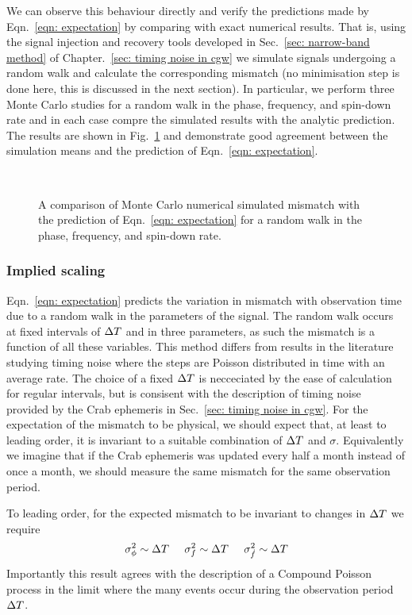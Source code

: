 We can observe this behaviour directly and verify the predictions made by
Eqn.~\eqref{eqn: expectation} by comparing with exact numerical results. That
is, using the signal injection and recovery tools developed in Sec.~\ref{sec:
narrow-band method} of Chapter.~\ref{sec: timing noise in cgw} we simulate
signals undergoing a random walk and calculate the corresponding mismatch (no
minimisation step is done here, this is discussed in the next section). In
particular, we perform three Monte Carlo studies for a random walk in the
phase, frequency, and spin-down rate and in each case compre the simulated
results with the analytic prediction. The results are shown in Fig.~\ref{fig: rw I}
and demonstrate good agreement between the simulation means and the prediction
of Eqn.~\eqref{eqn: expectation}.

\begin{figure}[ht]
\centering
{}
\\ 
\caption{A comparison of Monte Carlo numerical simulated mismatch with the prediction
of Eqn.~\eqref{eqn: expectation} for a random walk in the phase, frequency,
and spin-down rate.}
\label{fig: rw I}
\end{figure}

\subsubsection{Implied scaling}

Eqn.~\eqref{eqn: expectation} predicts the variation in mismatch with
observation time due to a random walk in the parameters of the signal. The
random walk occurs at fixed intervals of $\Delta T$ and in three parameters, as such
the mismatch is a function of all these variables. This method differs from
results in the literature studying timing noise \citep{Cordes1981} where the
steps are Poisson distributed in time with an average rate. The choice of a
fixed $\Delta T$ is necceciated by the ease of calculation for regular intervals,
but is consisent with the description of timing noise provided by the Crab
ephemeris in Sec.~\ref{sec: timing noise in cgw}.  For the expectation of the
mismatch to be physical, we should expect that, at least to leading order, it
is invariant to a suitable combination of $\Delta T$ and $\sigma$. Equivalently we
imagine that if the Crab ephemeris was updated every half a month instead of
once a month, we should measure the same mismatch for the same observation
period.

To leading order, for the expected mismatch to be invariant to changes in $\Delta T$
we require
\begin{equation}
\sigma_{\phi}^{2} \sim \Delta T \;\;\;\;\; \sigma_{f}^{2} \sim \Delta T \;\;\;\;\; \sigma_{\dot{f}}^{2} \sim \Delta T
\end{equation}
Importantly this result agrees with the description of a Compound Poisson
process in the limit where the many events occur during the observation period
$\Delta T$.

